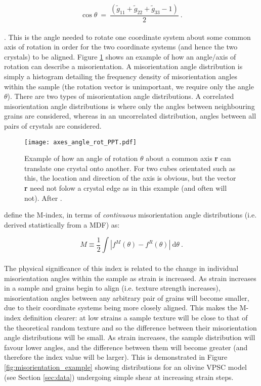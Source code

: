 \documentclass[a4paper,12pt,twoside]{report}
\numberwithin{equation}{chapter}
\begin{document}
\begin{equation} \label{eq:misorientation_angle}
\cos{\theta}\ =\ \frac{(\tilde{g}_{11} + \tilde{g}_{22} + \tilde{g}_{33} - 1)}{2}\ .
\end{equation} 
\\
\citep{Randle2000}. This is the angle needed to rotate one coordinate system about some common axis of rotation in order for the two coordinate systems (and hence the two crystals) to be aligned. Figure \ref{fig:angle-axis_example} shows an example of how an angle/axis of rotation can describe a misorientation. A misorientation angle distribution is simply a histogram detailing the frequency density of misorientation angles within the sample (the rotation vector is unimportant, we require only the angle $\theta$). There are two types of misorientation angle distributions. A correlated misorientation angle distributions is where only the angles between neighbouring grains are considered, whereas in an uncorrelated distribution, angles between all pairs of crystals are considered.

\begin{figure}[h]
  \centering
    \texttt{[image: axes\_angle\_rot\_PPT.pdf]}
  \caption[Angle/axis of rotation example]{Example of how an angle of rotation $\theta$ about a common axis \textbf{r} can translate one crystal onto another. For two cubes orientated such as this, the location and direction of the axis is obvious, but the vector \textbf{r} need not folow a crystal edge as in this example (and often will not). After \cite{Randle2000}.}
  \label{fig:angle-axis_example}
\end{figure}

\cite{Skemer} define the M-index, in terms of \emph{continuous} misorientation angle distributions (i.e. derived statistically from a MDF) as:

\begin{equation} \label{eq:Mindex_cont}
M \equiv \frac{1}{2} \int | f^M(\theta) - f^R(\theta) |\ \mathrm{d}\theta \ .
\end{equation}  
\\   
The physical significance of this index is related to the change in individual misorientation angles within the sample as strain is increased. As strain increases in a sample and grains begin to align (i.e. texture strength increases), misorientation angles between any arbitrary pair of grains will become smaller, due to their coordinate systems being more closely aligned. This makes the M-index definition clearer: at low strains a sample texture will be close to that of the theoretical random texture and so the difference between their misorientation angle distributions will be small. As strain increases, the sample distribution will favour lower angles, and the difference between them will become greater (and therefore the index value will be larger). This is demonstrated in Figure \ref{fig:misorientation_example} showing distributions for an olivine VPSC model (see Section \ref{sec:data}) undergoing simple shear at increasing strain steps.
\end{document}
